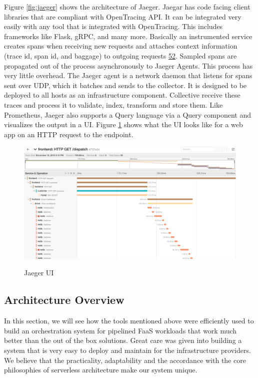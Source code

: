 \documentclass[12pt,titlepage]{article}
\begin{document}
Figure \ref{fig:jaeger} shows the architecture of Jaeger. Jaegar has code facing client libraries
that are compliant with OpenTracing API. It can be integrated very easily with
any tool that is integrated with OpenTracing. This includes frameworks like
Flask, gRPC, and many more. Basically an instrumented service creates spans when
receiving new requests and attaches context information (trace id, span id, and
baggage) to outgoing requests \hyperref[ref:52]{52}. Sampled spans are propagated out of
the process asynchronously to Jaeger Agents. This process has very little
overhead. The Jaeger agent is a network daemon that listens for spans sent over
UDP, which it batches and sends to the collector. It is designed to be deployed
to all hosts as an infrastructure component. Collective receive these traces and
process it to validate, index, transform and store them. Like Prometheus, Jaeger
also supports a Query language via a Query component and visualizes the output
in a UI. Figure \ref{fig:jaeger_traces} shows what the UI looks like for a web app on an HTTP request to
the endpoint. 
\begin{figure}[!h]
    \caption{Jaeger UI}
    \centering
    \includegraphics[width=130mm]{./thesis_images/jaeger_traces.png}
    \label{fig:jaeger_traces}
\end{figure}

\subsection{Architecture Overview}
\label{sec:orgc039474}
In this section, we will see how the tools mentioned above were efficiently used
to build an orchestration system for pipelined FaaS workloads that work much better than
the out of the box solutions. Great care was given into building a system that
is very easy to deploy and maintain for the infrastructure providers. We believe
that the practicality, adaptability and the accordance with the core
philosophies of serverless architecture make our system unique.
\end{document}
